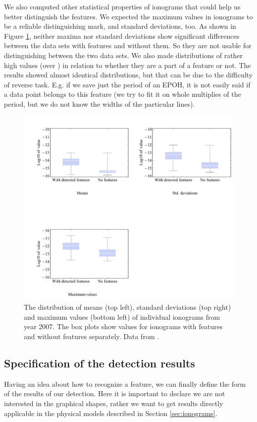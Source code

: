 We also computed other statistical properties of ionograms that could help us better distinguish the features. We expected the maximum values in ionograms to be a reliable distinguishing mark, and standard deviations, too. As shown in Figure \ref{fig:data_stats}, neither maxima nor standard deviations show significant differences between the data sets with features and without them. So they are not usable for distinguishing between the two data sets. We also made distributions of rather high values (over ) in relation to whether they are a part of a feature or not. The results showed almost identical distributions, but that can be due to the difficulty of reverse task. E.g. if we save just the period of an EPOH, it is not easily said if a data point belongs to this feature (we try to fit it on whole multiplies of the period, but we do not know the widths of the particular lines). 

\begin{figure}
	\centering
	\includegraphics[width=140mm]{images/data_stats.pdf}
	\caption{The distribution of means (top left), standard deviations (top right) and maximum values (bottom left) of individual ionograms from year 2007. The box plots show values for ionograms with features and without features separately. Data from \citep{FTP}.}
	\label{fig:data_stats}
\end{figure}

\subsection{Specification of the detection results}
Having an idea about how to recognize a feature, we can finally define the form of the results of our detection. Here it is important to declare we are not interested in the graphical shapes, rather we want to get results directly applicable in the physical models described in Section \ref{sec:ionograms}. 

